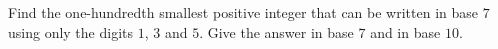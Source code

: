 Find the one-hundredth smallest positive integer that can be written in base $7$ using only the digits $1$, $3$ and $5$. Give the answer in base $7$ and in base $10$.
